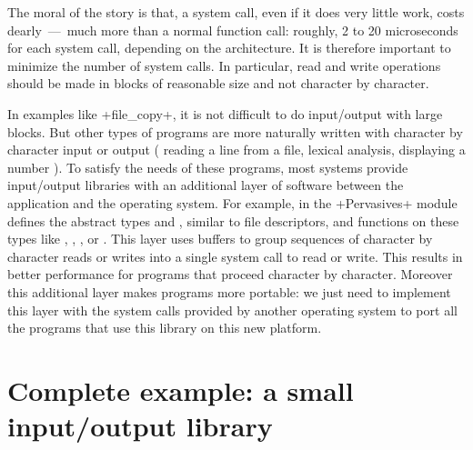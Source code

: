 The moral of the story is that, a system call, even if it does very little work,
costs dearly~---~much more than a normal function call: roughly, 2 to
20 microseconds for each system call, depending on the
architecture. It is therefore important to minimize the number of
system calls. In particular, read and write operations should be made
in blocks of reasonable size and not character by character.

In examples like \ml+file_copy+, it is not difficult to do
input/output with large blocks. But other types of programs are more
naturally written with character by character input or output (\eg{}
reading a line from a file, lexical analysis, displaying a number \etc).
To satisfy the needs of these programs, most systems provide
input/output libraries with an additional layer of software between
the application and the operating system. For example, in {\ocaml} the
\ml+Pervasives+ module defines the abstract types
 and
, similar to file descriptors, and
functions on these types like ,
,
, or
.  This layer uses buffers to
group sequences of character by character reads or writes into a
single system call to read or write. This results in better
performance for programs that proceed character by character.
Moreover this additional layer makes programs more portable: we just
need to implement this layer with the system calls provided by another
operating system to port all the programs that use this library on
this new platform.

\section{Complete example: a small input/output library}

